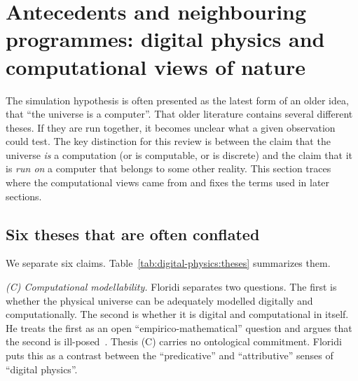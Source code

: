 \section{Antecedents and neighbouring programmes: digital physics and computational views of nature}
\label{sec:digital-physics}

The simulation hypothesis is often presented as the latest form of an older
idea, that ``the universe is a computer''. That older literature contains
several different theses. If they are run together, it becomes unclear what a
given observation could test. The key distinction for this review is between
the claim that the universe \emph{is} a computation (or is computable, or is
discrete) and the claim that it is \emph{run on} a computer that belongs to
some other reality. This section traces where the computational views came
from and fixes the terms used in later sections.

\subsection{Six theses that are often conflated}
\label{sec:digital-physics:theses}

We separate six claims. Table~\ref{tab:digital-physics:theses} summarizes them.

\emph{(C) Computational modellability.} Floridi separates two questions. The
first is whether the physical universe can be adequately modelled digitally
and computationally. The second is whether it is digital and computational in
itself. He treats the first as an open ``empirico-mathematical'' question and
argues that the second is ill-posed~\cite{Floridi2009against}. Thesis (C)
carries no ontological commitment. Floridi puts this as a contrast between the
``predicative'' and ``attributive'' senses of ``digital physics''.

